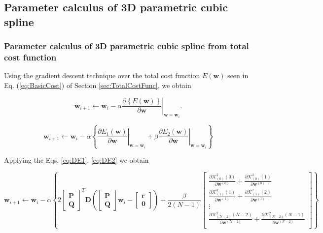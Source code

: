 \subsection{Parameter calculus of 3D parametric cubic spline}
\label{sec:solvecubicspline}

\subsubsection{Parameter calculus of 3D parametric cubic spline from total cost function}
Using the gradient descent technique over the total cost function $E(\mathbf{w})$ seen in Eq. (\ref{eq:BasicCost}) of Section \ref{sec:TotalCostFunc}, we obtain

\begin{equation}
\mathbf{w}_{i+1}
\leftarrow 
\mathbf{w}_{i}
-
\alpha
\left.
\frac{\partial 
\left\{
E(\mathbf{w})
\right\}
}{\partial \mathbf{w}}
\right|_{\mathbf{w}=\mathbf{w}_{i}}.
\end{equation}

\begin{equation}
\mathbf{w}_{i+1}
\leftarrow 
\mathbf{w}_{i}
-
\alpha
\left\{
\left.
\frac{\partial E_{1}(\mathbf{w})}{\partial \mathbf{w}}
\right|_{\mathbf{w}=\mathbf{w}_{i}}
+
\beta
\left.
\frac{\partial E_{2}(\mathbf{w})}{\partial \mathbf{w}}
\right|_{\mathbf{w}=\mathbf{w}_{i}}
\right\}
\end{equation}


Applying the Eqs. \ref{eq:DE1}, \ref{eq:DE2} we obtain

\begin{equation}
\mathbf{w}_{i+1}
\leftarrow 
\mathbf{w}_{i}
-
\alpha
\left\{
2
\begin{bmatrix}
\mathbf{P}\\
\mathbf{Q}
\end{bmatrix}^{T}
\mathbf{D}
\left(
\begin{bmatrix}
\mathbf{P}\\
\mathbf{Q}
\end{bmatrix}
\mathbf{w}_{i}
-
\begin{bmatrix}
\mathbf{r}\\
\mathbf{0}
\end{bmatrix}
\right)
+
\frac{\beta}{2(N-1)}
\begin{bmatrix}
%
\frac{
\partial 
\mathcal{K}_{(0)}^{2}(0)
}{\partial \mathbf{w}^{(0)}}
+
\frac{
\partial 
\mathcal{K}_{(0)}^{2}(1)
}{\partial \mathbf{w}^{(0)}}\\[4pt]
%
\frac{
\partial 
\mathcal{K}_{(1)}^{2}(1)
}{\partial \mathbf{w}^{(1)}}
+
\frac{
\partial 
\mathcal{K}_{(1)}^{2}(2)
}{\partial \mathbf{w}^{(1)}}\\[4pt]
%
\vdots\\[4pt]
\frac{
\partial 
\mathcal{K}_{(N-2)}^{2}(N-2)
}{\partial \mathbf{w}^{(N-2)}}
+
\frac{
\partial 
\mathcal{K}_{(N-2)}^{2}(N-1)
}{\partial \mathbf{w}^{(N-2)}}\\
%
\end{bmatrix}
\right\}
\end{equation}

